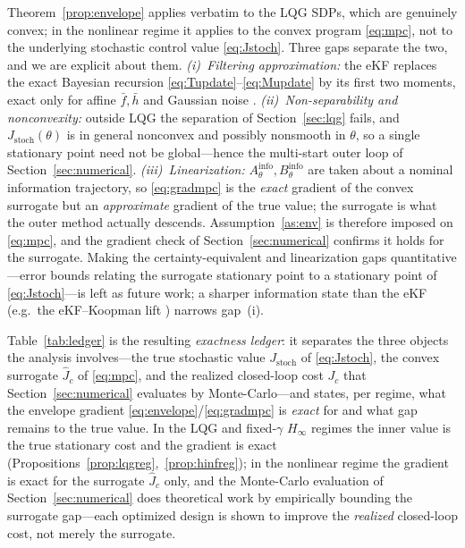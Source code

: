 \documentclass[twocolumn,amsthm]{autart}
\begin{document}
\begin{rem}\label{rem:ekfbreaks}
Theorem~\ref{prop:envelope} applies verbatim to the LQG SDPs, which are genuinely
convex; in the nonlinear regime it applies to the convex program \eqref{eq:mpc},
not to the underlying stochastic control value \eqref{eq:Jstoch}. Three gaps
separate the two, and we are explicit about them. \emph{(i)~Filtering
approximation:} the eKF replaces the exact Bayesian recursion
\eqref{eq:Tupdate}--\eqref{eq:Mupdate} by its first two moments, exact only for
affine $\bar f,\bar h$ and Gaussian noise \cite{anderson2012optimal}.
\emph{(ii)~Non-separability and nonconvexity:} outside LQG the separation of
Section~\ref{sec:lqg} fails, and $J_{\mathrm{stoch}}(\theta)$ is in general
nonconvex and possibly nonsmooth in $\theta$, so a single stationary point need
not be global---hence the multi-start outer loop of
Section~\ref{sec:numerical}. \emph{(iii)~Linearization:} $A_\theta^{\mathrm{info}},
B_\theta^{\mathrm{info}}$ are taken about a nominal information trajectory, so
\eqref{eq:gradmpc} is the \emph{exact} gradient of the convex surrogate but an
\emph{approximate} gradient of the true value; the surrogate is what the outer
method actually descends. Assumption~\ref{as:env} is therefore imposed on
\eqref{eq:mpc}, and the gradient check of Section~\ref{sec:numerical} confirms it
holds for the surrogate. Making the certainty-equivalent
and linearization gaps quantitative---error bounds relating the surrogate
stationary point to a stationary point of \eqref{eq:Jstoch}---is left as future
work; a sharper information state than the eKF (e.g.\ the eKF--Koopman lift
\cite{ramadan2024extended}) narrows gap~(i).
\end{rem}

Table~\ref{tab:ledger} is the resulting \emph{exactness ledger}: it separates the
three objects the analysis involves---the true stochastic value
$J_{\mathrm{stoch}}$ of \eqref{eq:Jstoch}, the convex surrogate $\widehat J_c$ of
\eqref{eq:mpc}, and the realized closed-loop cost $J_c$ that
Section~\ref{sec:numerical} evaluates by Monte-Carlo---and states, per regime, what
the envelope gradient \eqref{eq:envelope}/\eqref{eq:gradmpc} is \emph{exact} for
and what gap remains to the true value. In the LQG and fixed-$\gamma$ $H_\infty$
regimes the inner value is the true stationary cost and the gradient is exact
(Propositions~\ref{prop:lqgreg},~\ref{prop:hinfreg}); in the nonlinear regime the
gradient is exact for the surrogate $\widehat J_c$ only, and the Monte-Carlo
evaluation of Section~\ref{sec:numerical} does theoretical work by empirically
bounding the surrogate gap---each optimized design is shown to improve the
\emph{realized} closed-loop cost, not merely the surrogate.
\end{document}
